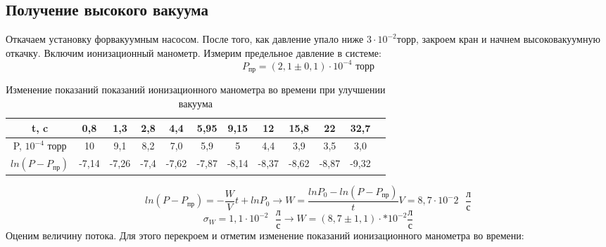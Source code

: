 \documentclass[a4paper]{article}
\begin{document}
	\subsection{Получение высокого вакуума}
	Откачаем установку форвакуумным насосом. После того, как давление упало ниже $3\cdot 10^{-2} торр$, закроем кран и начнем высоковакуумную откачку. Включим ионизационный манометр. Измерим предельное давление в системе:
	\begin{equation}
	P_\text{пр}=(2,1 \pm 0,1) \cdot 10^{-4} \text{ торр}
	\end{equation}
	\begin{table}[h!]
 		\centering
    	\begin{tabular}{|c|c|c|c|c|c|c|c|c|c|c|c|}
    		\hline
    		t, c & 0,8 & 1,3 & 2,8 & 4,4 & 5,95 & 9,15 & 12 & 15,8 & 22 & 32,7 \\
    		\hline
    		P, $10^{-4}$ торр & 10 & 9,1 & 8,2 & 7,0 & 5,9 & 5 & 4,4 & 3,9 & 3,5 & 3,0 \\
    		\hline
    		$ln(P-P_\text{пр})$ & -7,14 & -7,26 & -7,4 & -7,62 & -7,87 & -8,14 & -8,37 & -8,62 & -8,87 & -9,32 \\
    		\hline
    	\end{tabular}
  		\caption{Изменение показаний показаний ионизационного манометра во времени при улучшении вакуума}
	\end{table}
	\begin{equation}
	ln(P-P_\text{пр})=-\frac{W}{V}t+lnP_0 \rightarrow W=\frac{lnP_0-ln(P-P_\text{пр})}{t}V=8,7\cdot 10^-2 \text{ }\frac{\text{л}}{\text{с}}
	\end{equation}
	\begin{equation}
	\sigma _W=1,1 \cdot 10^{-2} \text{ } \frac{\text{л}}{\text{с}} \rightarrow W=(8,7\pm 1,1) \cdot * 10^{-2} \frac{\text{л}}{\text{с}}
	\end{equation}
	Оценим величину потока. Для этого перекроем и отметим изменение показаний ионизационного манометра во времени:
	
\end{document}
